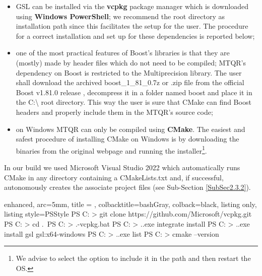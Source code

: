 \documentclass[a4paper, twosided]{book}
\begin{document}
\begin{itemize}
   \item GSL can be installed via the \color{poliDarkBlue} \textbf{vcpkg} \color{black} package manager which is downloaded using \color{poliDarkBlue} \textbf{Windows PowerShell}\color{black}; we recommend the root directory as installation path since this facilitates the setup for the user. The procedure for a correct installation and set up for these dependencies is reported below;

    \item one of the most practical features of Boost's libraries is that they are (mostly) made by header files which do not need to be compiled; MTQR's dependency on Boost is restricted to the Multiprecision library. The user shall download the archived \colorbox{poliGrayBlue}{boost\_1\_81\_0.7z or .zip}  file from the official Boost v1.81.0 release \cite{boost_release}, decompress it in a folder named \colorbox{poliGrayBlue}{boost} and place it in the \colorbox{poliGrayBlue}{C:\textbackslash} root directory. This way the user is sure that \colorbox{poliGrayBlue}{CMake} can find Boost headers and properly include them in the MTQR's source code;

    \item on Windows MTQR can only be compiled using \color{poliDarkBlue} \textbf{CMake}\color{black}. The easiest and safest procedure of installing CMake on Windows is by downloading the binaries from the original webpage and running the installer\footnote{We advise to select the option to include it in the path and then restart the OS.}.
\end{itemize}

\noindent
In our build we used Microsoft Visual Studio 2022 which automatically runs \colorbox{poliGrayBlue}{CMake} in any directory containing a \colorbox{poliGrayBlue}{CMakeLists.txt} and, if successful, autonomously creates the associate project files (see Sub-Section \ref{SubSec2.3.2}).
\vspace{0.15cm}
\begin{tcblisting}{enhanced,
                    arc=5mm,
                    title = \color{black}{\large \ttfamily Installation of third-party libraries (Windows)},
                    colbacktitle=bashGray,
                    colback=black,
                    listing only,
                    listing style=PSStyle}
PS C: > git clone https://github.com/Microsoft/vcpkg.git
PS C: > cd .\vcpkg\
PS C: > .\bootstrap-vcpkg.bat
PS C: > .\vcpkg.exe integrate install
PS C: > .\vcpkg.exe install gsl gsl:x64-windows
PS C: > .\vcpkg.exe list
PS C: > cmake --version
\end{tcblisting}
\vspace{-0.2cm}
\end{document}
